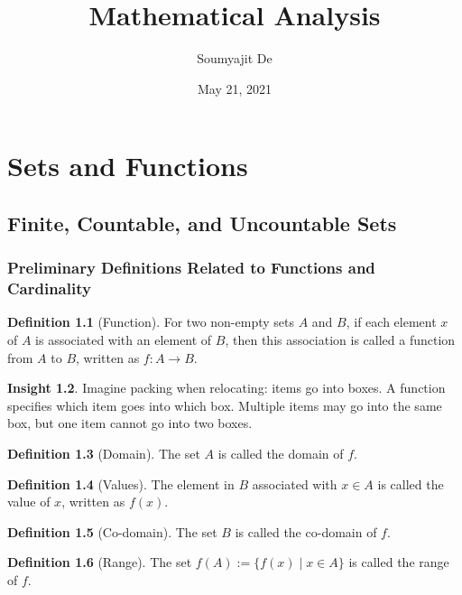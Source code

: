 \documentclass[11pt]{book}
\title{Mathematical Analysis}
\author{Soumyajit De}
\date{May 21, 2021}
\theoremstyle{definition}
\newtheorem{definition}{Definition}[chapter]
\newtheorem{insight}[definition]{Insight}
\theoremstyle{plain}
\begin{document}
\maketitle
\tableofcontents

\chapter{Sets and Functions}

\section{Finite, Countable, and Uncountable Sets}

\subsection{Preliminary Definitions Related to Functions and Cardinality}

\begin{definition}[Function]
For two non-empty sets $A$ and $B$, if each element $x$ of $A$ is associated with an element of $B$,
then this association is called a function from $A$ to $B$, written as $f : A \to B$.
\end{definition}

\begin{insight}
Imagine packing when relocating: items go into boxes. A function specifies which item goes into which box.
Multiple items may go into the same box, but one item cannot go into two boxes.
\end{insight}

\begin{definition}[Domain]
The set $A$ is called the domain of $f$.
\end{definition}

\begin{definition}[Values]
The element in $B$ associated with $x \in A$ is called the value of $x$, written as $f(x)$.
\end{definition}

\begin{definition}[Co-domain]
The set $B$ is called the co-domain of $f$.
\end{definition}

\begin{definition}[Range]
The set $f(A) := \{ f(x) \mid x \in A \}$ is called the range of $f$.
\end{definition}
\end{document}
